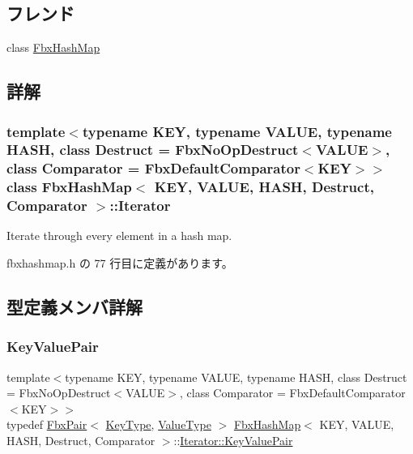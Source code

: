 \subsection*{フレンド}
\begin{DoxyCompactItemize}
\item 
class \hyperlink{class_fbx_hash_map_1_1_iterator_a58c051a31d06809f29f78fa92219181c}{Fbx\+Hash\+Map}
\end{DoxyCompactItemize}


\subsection{詳解}
\subsubsection*{template$<$typename K\+EY, typename V\+A\+L\+UE, typename H\+A\+SH, class Destruct = Fbx\+No\+Op\+Destruct$<$\+V\+A\+L\+U\+E$>$, class Comparator = Fbx\+Default\+Comparator$<$\+K\+E\+Y$>$$>$\newline
class Fbx\+Hash\+Map$<$ K\+E\+Y, V\+A\+L\+U\+E, H\+A\+S\+H, Destruct, Comparator $>$\+::\+Iterator}

Iterate through every element in a hash map. 

 fbxhashmap.\+h の 77 行目に定義があります。



\subsection{型定義メンバ詳解}
\mbox{\label{class_fbx_hash_map_1_1_iterator_a2a68388bbedcb2e86a927259561fc1d4}} 
\subsubsection{\texorpdfstring{Key\+Value\+Pair}{KeyValuePair}}
{\footnotesize\ttfamily template$<$typename K\+EY, typename V\+A\+L\+UE, typename H\+A\+SH, class Destruct = Fbx\+No\+Op\+Destruct$<$\+V\+A\+L\+U\+E$>$, class Comparator = Fbx\+Default\+Comparator$<$\+K\+E\+Y$>$$>$ \\
typedef \hyperlink{class_fbx_pair}{Fbx\+Pair}$<$ \hyperlink{class_fbx_hash_map_ab56799173b6c58b676a94370b64ddbb0}{Key\+Type}, \hyperlink{class_fbx_hash_map_a9c4cfd0138aa9233c119403f3cc85501}{Value\+Type} $>$ \hyperlink{class_fbx_hash_map}{Fbx\+Hash\+Map}$<$ K\+EY, V\+A\+L\+UE, H\+A\+SH, Destruct, Comparator $>$\+::\hyperlink{class_fbx_hash_map_1_1_iterator_a2a68388bbedcb2e86a927259561fc1d4}{Iterator\+::\+Key\+Value\+Pair}}



